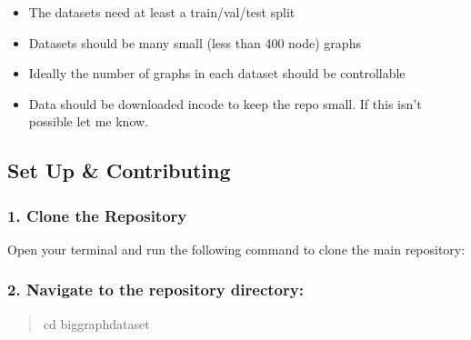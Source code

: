 \documentclass[letterpaper,10pt,english]{sphinxhowto}
\begin{document}
\begin{description}
\begin{description}
\begin{itemize}
\item {} 
\sphinxAtStartPar
The datasets need at least a train/val/test split

\item {} 
\sphinxAtStartPar
Datasets should be many small (less than 400 node) graphs

\item {} 
\sphinxAtStartPar
Ideally the number of graphs in each dataset should be controllable

\item {} 
\sphinxAtStartPar
Data should be downloaded in\sphinxhyphen{}code to keep the repo small. If this isn’t possible let me know.

\end{itemize}

\end{description}


\subsection{Set Up \& Contributing}
\label{\detokenize{get-started:set-up-contributing}}\label{\detokenize{get-started::doc}}

\subsubsection{1. Clone the Repository}
\label{\detokenize{get-started:clone-the-repository}}
\sphinxAtStartPar
Open your terminal and run the following command to clone the main repository:

\begin{sphinxVerbatim}[commandchars=\\\{\}]
  
\end{sphinxVerbatim}


\subsubsection{2. Navigate to the repository directory:}
\label{\detokenize{get-started:navigate-to-the-repository-directory}}\begin{quote}

\sphinxAtStartPar
cd big\sphinxhyphen{}graph\sphinxhyphen{}dataset
\end{quote}



\end{description}
\end{document}

